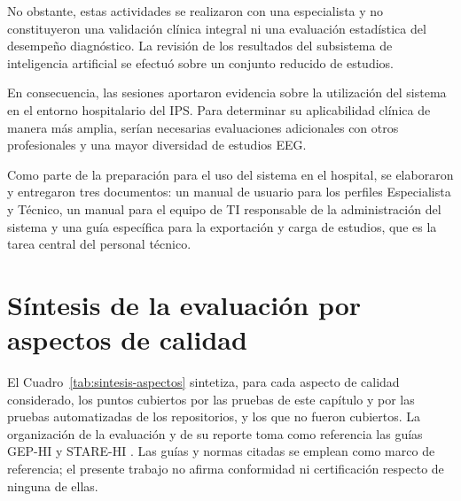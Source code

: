 No obstante, estas actividades se realizaron con una especialista y no constituyeron una validación clínica integral ni una evaluación estadística del desempeño diagnóstico. La revisión de los resultados del subsistema de inteligencia artificial se efectuó sobre un conjunto reducido de estudios.

En consecuencia, las sesiones aportaron evidencia sobre la utilización del sistema en el entorno hospitalario del IPS. Para determinar su aplicabilidad clínica de manera más amplia, serían necesarias evaluaciones adicionales con otros profesionales y una mayor diversidad de estudios EEG.

Como parte de la preparación para el uso del sistema en el hospital, se elaboraron y entregaron tres documentos: un manual de usuario para los perfiles Especialista y Técnico, un manual para el equipo de TI responsable de la administración del sistema y una guía específica para la exportación y carga de estudios, que es la tarea central del personal técnico.

\section{Síntesis de la evaluación por aspectos de calidad}
\label{sec:sintesis-aspectos}

El Cuadro~\ref{tab:sintesis-aspectos} sintetiza, para cada aspecto de calidad considerado, los puntos cubiertos por las pruebas de este capítulo y por las pruebas automatizadas de los repositorios, y los que no fueron cubiertos.
La organización de la evaluación y de su reporte toma como referencia las guías GEP-HI \citep{Nykanen2011GEPHI} y STARE-HI \citep{Talmon2009STAREHI}.
Las guías y normas citadas se emplean como marco de referencia; el presente trabajo no afirma conformidad ni certificación respecto de ninguna de ellas.

